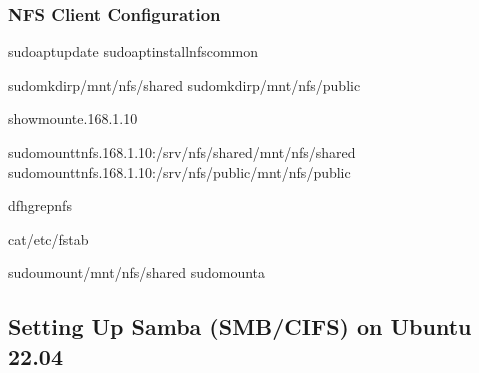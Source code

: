 \documentclass[letterpaper,10pt,english]{sphinxmanual}
\begin{document}
\subsubsection{NFS Client Configuration}
\label{\detokenize{network-storage:nfs-client-configuration}}
\begin{sphinxVerbatim}[commandchars=\\\{\}]
sudoaptupdate
sudoaptinstallnfs\PYGZhy{}common

sudomkdir\PYGZhy{}p/mnt/nfs/shared
sudomkdir\PYGZhy{}p/mnt/nfs/public

showmount\PYGZhy{}e.168.1.10

sudomount\PYGZhy{}tnfs.168.1.10:/srv/nfs/shared/mnt/nfs/shared
sudomount\PYGZhy{}tnfs.168.1.10:/srv/nfs/public/mnt/nfs/public

df\PYGZhy{}hgrepnfs

cat\PYGZgt{}\PYGZgt{}/etc/fstab

sudoumount/mnt/nfs/shared
sudomount\PYGZhy{}a
\end{sphinxVerbatim}


\subsection{Setting Up Samba (SMB/CIFS) on Ubuntu 22.04}
\label{\detokenize{network-storage:setting-up-samba-smb-cifs-on-ubuntu-22-04}}
\end{document}
